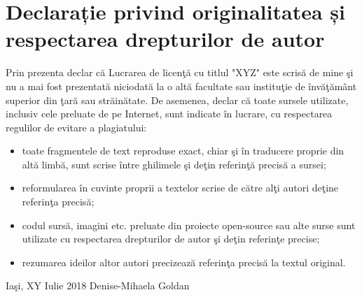 \chapter*{\large {Declarație privind originalitatea și respectarea drepturilor de autor}}

Prin prezenta declar că Lucrarea de licenţă cu titlul "XYZ" este scrisă de mine şi nu a mai fost prezentată niciodată la o altă facultate sau instituţie de învăţământ superior din ţară sau străinătate. De asemenea, declar că toate sursele utilizate, inclusiv cele preluate de pe Internet, sunt indicate în lucrare, cu respectarea regulilor de evitare a plagiatului: 

\begin{itemize}
	\item toate fragmentele de text reproduse exact, chiar şi în traducere proprie din altă limbă, sunt scrise între ghilimele şi deţin referinţă precisă a sursei;
	\item reformularea în cuvinte proprii a textelor scrise de către alţi autori deţine referinţa precisă;
	\item codul sursă, imagini etc. preluate din proiecte open-source  sau alte  surse  sunt  utilizate  cu respectarea drepturilor de autor şi deţin referinţe precise;  
	\item rezumarea ideilor altor autori precizează referinţa precisă la textul original.
\end{itemize}

\hfill \break
\hfill \break

Iaşi, XY Iulie 2018 \hfill Denise-Mihaela Goldan\\


\clearpage
